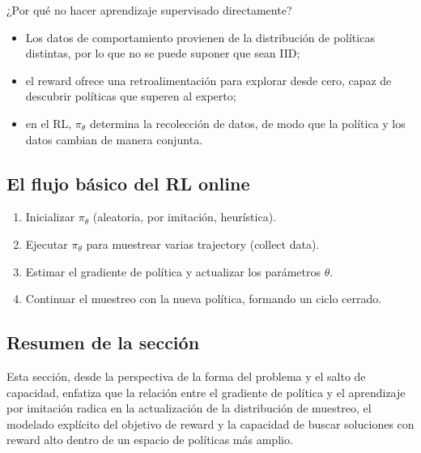 \begin{importantbox}{¿Por qué no hacer aprendizaje supervisado directamente?}
\begin{itemize}
    \item Los datos de comportamiento provienen de la distribución de políticas distintas, por lo que no se puede suponer que sean IID;
    \item el reward ofrece una retroalimentación para explorar desde cero, capaz de descubrir políticas que superen al experto;
    \item en el RL, $\pi_\theta$ determina la recolección de datos, de modo que la política y los datos cambian de manera conjunta.
\end{itemize}
\end{importantbox}

\subsection{El flujo básico del RL online}

\begin{enumerate}
    \item Inicializar $\pi_\theta$ (aleatoria, por imitación, heurística).
    \item Ejecutar $\pi_\theta$ para muestrear varias trajectory (collect data).
    \item Estimar el gradiente de política y actualizar los parámetros $\theta$.
    \item Continuar el muestreo con la nueva política, formando un ciclo cerrado.
\end{enumerate}

\subsection{Resumen de la sección}

Esta sección, desde la perspectiva de la forma del problema y el salto de capacidad, enfatiza que la relación entre el gradiente de política y el aprendizaje por imitación radica en la actualización de la distribución de muestreo, el modelado explícito del objetivo de reward y la capacidad de buscar soluciones con reward alto dentro de un espacio de políticas más amplio.

